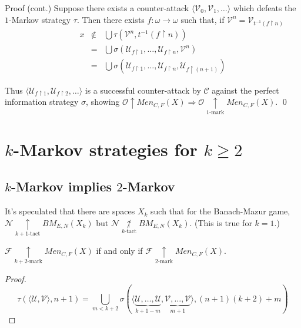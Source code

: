 \documentclass{beamer}
\theoremstyle{definition}
\newcommand{\win}{\uparrow}
\newcommand{\kmarkwin}[1]{\underset{#1\text{-mark}}{\uparrow}}
\newcommand{\ktactwin}[1]{\underset{#1\text{-tact}}{\uparrow}}
\newcommand{\notktactwin}[1]{\underset{#1\text{-tact}}{\not\uparrow}}
\newcommand{\mengame}[1]{Men_{C,F}(#1)}
\newcommand{\bmGame}[1]{BM_{E,N}(#1)}
\newcommand{\rest}{\restriction}
\newcommand{\<}{\langle}
\renewcommand{\>}{\rangle}
\newcommand{\mc}[1]{\mathcal{#1}}
\newcommand{\pl}[1]{\mathscr{#1}}
\begin{document}
\begin{frame}{Proof (cont.)}
  Suppose there exists a counter-attack $\<\mc V_0,\mc V_1,\dots\>$ which
  defeats the $1$-Markov strategy $\tau$. Then there exists
  $f:\omega\to\omega$ such that, if $\mc V^n=\mc V_{t^{-1}(f\rest n)}$
  \[
    \begin{array}{rcl}
    x & \not\in & \bigcup \tau(\mc V^n,t^{-1}(f\rest n)) \\
    & = & \bigcup\sigma(\mc U_{f\rest 1},\dots,\mc U_{f\rest n},\mc V^n) \\
    & = & \bigcup\sigma(\mc U_{f\rest 1},\dots,\mc U_{f\rest n},\mc U_{f\rest (n+1)})
    \end{array}
  \]

  \vpause

  Thus $\<\mc U_{f\rest 1}, \mc U_{f\rest 2},\dots\>$ is a successful
  counter-attack by $\pl C$ against the perfect information strategy $\sigma$,
  showing $\pl O\win\mengame{X}\Rightarrow\pl O\kmarkwin{1}\mengame{X}$.
  \qed
\end{frame}

\section{$k$-Markov strategies for $k\geq 2$}

\subsection{$k$-Markov implies $2$-Markov}

\begin{frame}
  It's speculated that there are spaces $X_k$ such that for the Banach-Mazur
  game, $\pl N\ktactwin{k+1}\bmGame{X_k}$ but $\pl N\notktactwin{k}\bmGame{X_k}$.
  (This is true for $k=1$.)

  \pause

  \begin{theorem}
    $\pl F \kmarkwin{k+2}\mengame X$
    if and only if
    $\pl F \kmarkwin2\mengame X$.
  \end{theorem}

  \begin{proof}
    \[
      \tau(\<\mc U,\mc V\>,n+1)
        =
      \bigcup_{m<k+2}
        \sigma(\<
          \underbrace{\mc U,\dots,\mc U}_{k+1-m},
          \underbrace{\mc V,\dots,\mc V}_{m+1}
        \>,(n+1)(k+2)+m)
    \]
  \end{proof}
\end{frame}
\end{document}
